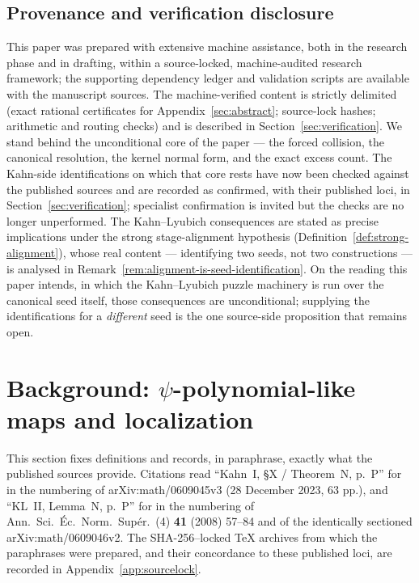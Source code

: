 \documentclass[11pt,reqno]{amsart}
\theoremstyle{definition}
\theoremstyle{remark}
\begin{document}
\subsection*{Provenance and verification disclosure}
This paper was prepared with extensive machine assistance, both in the
research phase and in drafting, within a source-locked, machine-audited
research framework; the supporting dependency ledger and validation
scripts are available with the manuscript sources.  The
machine-verified content is strictly delimited (exact rational
certificates for Appendix~\ref{sec:abstract}; source-lock hashes;
arithmetic and routing checks) and is described in
Section~\ref{sec:verification}.  We stand behind the unconditional
core of the paper --- the forced collision, the canonical resolution,
the kernel normal form, and the exact excess count.  The Kahn-side
identifications on which that core rests have now been checked against
the published sources and are recorded as confirmed, with their
published loci, in Section~\ref{sec:verification}; specialist
confirmation is invited but the checks are no longer unperformed.  The
Kahn--Lyubich consequences are stated as precise implications under
the strong stage-alignment hypothesis
(Definition~\ref{def:strong-alignment}), whose real content ---
identifying two seeds, not two constructions --- is analysed in
Remark~\ref{rem:alignment-is-seed-identification}.  On the reading
this paper intends, in which the Kahn--Lyubich puzzle machinery is run
over the canonical seed itself, those consequences are unconditional;
supplying the identifications for a \emph{different} seed is the one
source-side proposition that remains open.

\section{Background: $\psi$-polynomial-like maps and localization}
\label{sec:background}

This section fixes definitions and records, in paraphrase, exactly what
the published sources provide.  Citations read
``Kahn~I, \S X / Theorem~N, p.~P'' for
\cite{KahnPrimitive06} in the numbering of arXiv:math/0609045v3
(28 December 2023, 63 pp.), and ``KL~II, Lemma~N, p.~P'' for
\cite{KLDecorations08} in the numbering of
Ann.\ Sci.\ \'Ec.\ Norm.\ Sup\'er.\ (4) \textbf{41} (2008) 57--84 and
of the identically sectioned arXiv:math/0609046v2.  The SHA-256--locked
\TeX{} archives from which the paraphrases were prepared, and their
concordance to these published loci, are recorded in
Appendix~\ref{app:sourcelock}.
\end{document}
